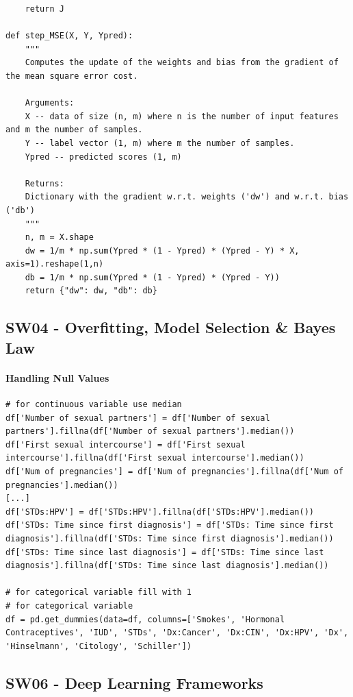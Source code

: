 \documentclass[11pt]{article}
\begin{document}
\begin{verbatim}
	return J

def step_MSE(X, Y, Ypred):
	"""
	Computes the update of the weights and bias from the gradient of the mean square error cost. 
	
	Arguments:
	X -- data of size (n, m) where n is the number of input features and m the number of samples.
	Y -- label vector (1, m) where m the number of samples.
	Ypred -- predicted scores (1, m)
	
	Returns:
	Dictionary with the gradient w.r.t. weights ('dw') and w.r.t. bias ('db')
	"""
	n, m = X.shape
	dw = 1/m * np.sum(Ypred * (1 - Ypred) * (Ypred - Y) * X, axis=1).reshape(1,n)
	db = 1/m * np.sum(Ypred * (1 - Ypred) * (Ypred - Y))
	return {"dw": dw, "db": db}
\end{verbatim}

\subsection{SW04 - Overfitting, Model Selection \& Bayes Law}
\paragraph{Handling Null Values}
\begin{verbatim}
# for continuous variable use median
df['Number of sexual partners'] = df['Number of sexual partners'].fillna(df['Number of sexual partners'].median())
df['First sexual intercourse'] = df['First sexual intercourse'].fillna(df['First sexual intercourse'].median())
df['Num of pregnancies'] = df['Num of pregnancies'].fillna(df['Num of pregnancies'].median())
[...]
df['STDs:HPV'] = df['STDs:HPV'].fillna(df['STDs:HPV'].median())
df['STDs: Time since first diagnosis'] = df['STDs: Time since first diagnosis'].fillna(df['STDs: Time since first diagnosis'].median())
df['STDs: Time since last diagnosis'] = df['STDs: Time since last diagnosis'].fillna(df['STDs: Time since last diagnosis'].median())

# for categorical variable fill with 1
# for categorical variable
df = pd.get_dummies(data=df, columns=['Smokes', 'Hormonal Contraceptives', 'IUD', 'STDs', 'Dx:Cancer', 'Dx:CIN', 'Dx:HPV', 'Dx', 'Hinselmann', 'Citology', 'Schiller'])
\end{verbatim}

\subsection{SW06 - Deep Learning Frameworks}
\end{document}
